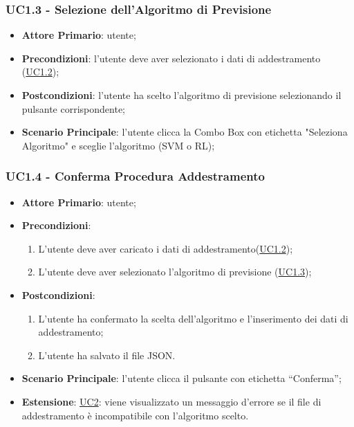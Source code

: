 		\subsubsection{UC1.3 - Selezione dell’Algoritmo di Previsione}
		\begin{itemize}
			\item\textbf{Attore Primario}: utente;
			\item\textbf{Precondizioni}: l’utente deve aver selezionato i dati di addestramento (\hyperref[par:UC1.2]{UC1.2}); 
			\item\textbf{Postcondizioni}: l’utente ha scelto l’algoritmo di previsione selezionando il pulsante corrispondente;
			\item\textbf{Scenario Principale}: l’utente clicca la Combo Box con etichetta "Seleziona Algoritmo" e sceglie l’algoritmo (SVM o RL);
		\end{itemize}
	
	\label{par:UC1.4}
	\subsubsection{UC1.4 - Conferma Procedura Addestramento}
		\begin{itemize}
			\item\textbf{Attore Primario}: utente;
			\item\textbf{Precondizioni}:
				\begin{enumerate}
					\item L’utente deve aver caricato i dati di addestramento(\hyperref[par:UC1.2]{UC1.2});
					\item  L’utente deve aver selezionato l’algoritmo di previsione (\hyperref[par:UC1.3]{UC1.3}); 
				\end{enumerate}
			\item\textbf{Postcondizioni}:
				\begin{enumerate}
					\item L’utente ha confermato la scelta dell’algoritmo e l’inserimento dei dati di addestramento;
					\item L’utente ha salvato il file JSON.
				\end{enumerate}
			\item\textbf{Scenario Principale}: l’utente clicca il pulsante con etichetta “Conferma”;
			\item\textbf{Estensione}:  \hyperref[par:UC2]{UC2}: viene visualizzato un messaggio d’errore se il file di addestramento è incompatibile con l’algoritmo scelto. 	
		\end{itemize}


